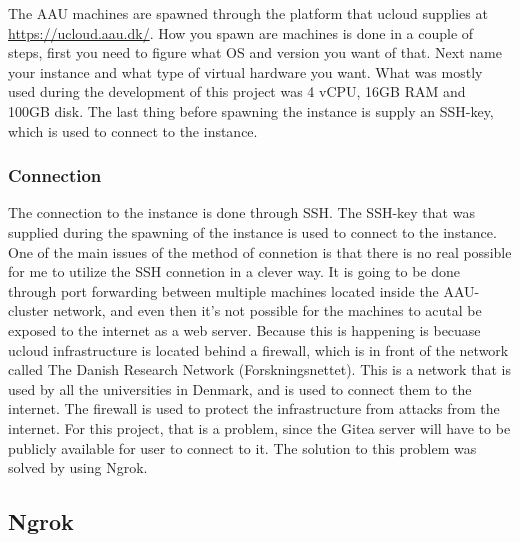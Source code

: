 The AAU machines are spawned through the platform that ucloud supplies at \url{https://ucloud.aau.dk/}. How you spawn are machines is done 
in a couple of steps, first you need to figure what OS and version you want of that. Next name your instance and what type of 
virtual hardware you want. What was mostly used during the development of this project was 4 vCPU, 16GB RAM and 100GB disk.
The last thing before spawning the instance is supply an SSH-key, which is used to connect to the instance.

\subsubsection{Connection}
\label{subsubsec:connection-ucloud}
The connection to the instance is done through SSH. 
The SSH-key that was supplied during the spawning of the instance is used to connect to the instance. One of the main issues of the 
method of connetion is that there is no real possible for me to utilize the SSH connetion in a clever way. It is going to be done through 
port forwarding between multiple machines located inside the AAU-cluster network, and even then it's not possible for the machines 
to acutal be exposed to the internet as a web server. Because this is happening is becuase ucloud infrastructure is located behind a 
firewall, which is in front of the network called The Danish Research Network (Forskningsnettet). This is a network that is
used by all the universities in Denmark, and is used to connect them to the internet. The firewall is used to protect the
infrastructure from attacks from the internet. For this project, that is a problem, since the Gitea server will have to be publicly available 
for user to connect to it. 
The solution to this problem was solved by using Ngrok.

\subsection{Ngrok}
\label{subsec:ngrok}


